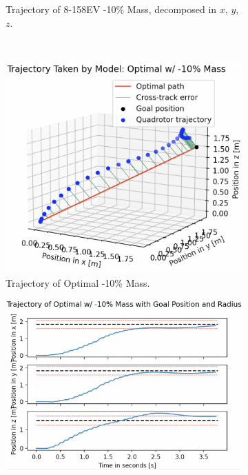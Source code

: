 \begin{figure}[H]
\begin{subfigure}[b]{0.49\textwidth}
         \caption{Trajectory of 8-158EV -10\% Mass, decomposed in $x$, $y$, $z$.}
         \label{fig:testing_robust-10_ppo8158EV2}
     \end{subfigure} 
     \hfill \\[1mm]
    \begin{subfigure}[b]{0.48\textwidth}
         \centering
         \captionsetup{justification=centering}
         \includegraphics[width=\textwidth]{figures/5_/Testing/ppo_test_robust-10-Optimal1.png}
         \caption{Trajectory of Optimal -10\% Mass.}
         \label{fig:testing_robust-10_ppoOptimal1}
     \end{subfigure} 
     \hfill 
     \begin{subfigure}[b]{0.49\textwidth}
         \centering
         \captionsetup{justification=centering}
         \includegraphics[width=\textwidth]{figures/5_/Testing/ppo_test_robust-10-Optimal2.png}

\end{subfigure}
\end{figure}
